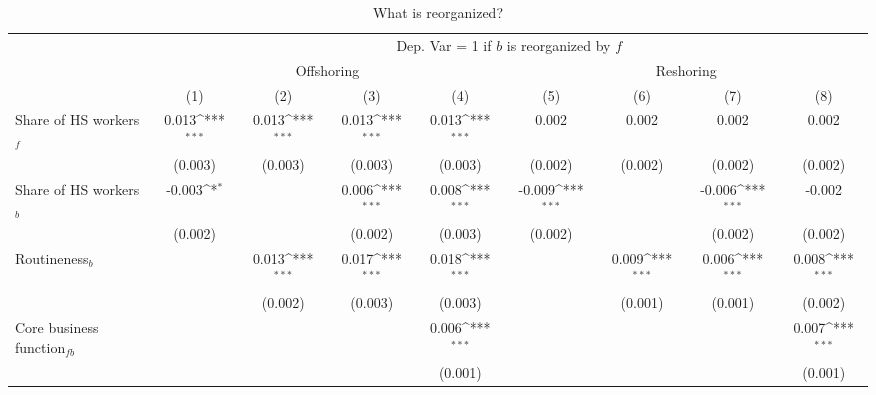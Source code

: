 \begin{table}[htbp] \footnotesize \centering
\def\sym#1{\ifmmode^{#1}\else\(^{#1}\)\fi}
\caption{What is reorganized? \label{tab:reg_what_paper}}
\renewcommand{\arraystretch}{1}
\begin{tabular}{l*{8}{c}}
\toprule
&\multicolumn{8}{c}{Dep. Var = 1 if $ b $ is reorganized by $ f $} \\
\cmidrule(lr){2-9}
                &\multicolumn{4}{c}{Offshoring}                                             &\multicolumn{4}{c}{Reshoring}                                              \\\cmidrule(lr){2-5}\cmidrule(lr){6-9}
                &\multicolumn{1}{c}{(1)}         &\multicolumn{1}{c}{(2)}         &\multicolumn{1}{c}{(3)}         &\multicolumn{1}{c}{(4)}         &\multicolumn{1}{c}{(5)}         &\multicolumn{1}{c}{(6)}         &\multicolumn{1}{c}{(7)}         &\multicolumn{1}{c}{(8)}         \\
\midrule
Share of HS workers$ _f$&    0.013\sym{***}&    0.013\sym{***}&    0.013\sym{***}&    0.013\sym{***}&    0.002         &    0.002         &    0.002         &    0.002         \\
                &  (0.003)         &  (0.003)         &  (0.003)         &  (0.003)         &  (0.002)         &  (0.002)         &  (0.002)         &  (0.002)         \\
\addlinespace
Share of HS workers$ _b$&   -0.003\sym{*}  &                  &    0.006\sym{***}&    0.008\sym{***}&   -0.009\sym{***}&                  &   -0.006\sym{***}&   -0.002         \\
                &  (0.002)         &                  &  (0.002)         &  (0.003)         &  (0.002)         &                  &  (0.002)         &  (0.002)         \\
\addlinespace
Routineness$ _b$&                  &    0.013\sym{***}&    0.017\sym{***}&    0.018\sym{***}&                  &    0.009\sym{***}&    0.006\sym{***}&    0.008\sym{***}\\
                &                  &  (0.002)         &  (0.003)         &  (0.003)         &                  &  (0.001)         &  (0.001)         &  (0.002)         \\
\addlinespace
Core business function$ _{fb}$&                  &                  &                  &    0.006\sym{***}&                  &                  &                  &    0.007\sym{***}\\
                &                  &                  &                  &  (0.001)         &                  &                  &                  &  (0.001)         \\

\end{tabular}
\end{table}
